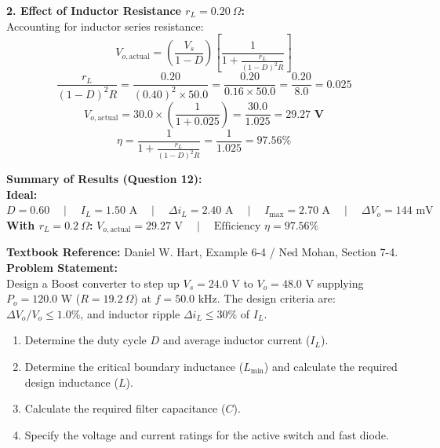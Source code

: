 \documentclass[10pt,a4paper]{article}
\begin{document}
\noindent\textbf{2. Effect of Inductor Resistance $r_L = 0.20\ \Omega$:}\\
Accounting for inductor series resistance:
\[
V_{o,\text{actual}} = \left(\frac{V_s}{1 - D}\right) \left[\frac{1}{1 + \frac{r_L}{(1 - D)^2 R}}\right]
\]
\[
\frac{r_L}{(1 - D)^2 R} = \frac{0.20}{(0.40)^2 \times 50.0} = \frac{0.20}{0.16 \times 50.0} = \frac{0.20}{8.0} = 0.025
\]
\[
V_{o,\text{actual}} = 30.0 \times \left(\frac{1}{1 + 0.025}\right) = \frac{30.0}{1.025} = \mathbf{29.27\text{ V}}
\]
\[
\eta = \frac{1}{1 + \frac{r_L}{(1 - D)^2 R}} = \frac{1}{1.025} = \mathbf{97.56\%}
\]

\begin{tcolorbox}[resbox]
\textbf{\textcolor{accentcyan}{Summary of Results (Question 12):}}\\
\textbf{Ideal:} $D = 0.60 \quad\mid\quad I_L = 1.50\text{ A} \quad\mid\quad \Delta i_L = 2.40\text{ A} \quad\mid\quad I_{\max} = 2.70\text{ A} \quad\mid\quad \Delta V_o = 144\text{ mV}$\\
\textbf{With $r_L = 0.2\ \Omega$:} $V_{o,\text{actual}} = 29.27\text{ V} \quad\mid\quad \text{Efficiency } \eta = 97.56\%$
\end{tcolorbox}

\vspace{4mm}

\begin{tcolorbox}[qbox, title={Question 13: Boost Converter Design --- Filter Sizing and Power Device Selection}]
\textbf{Textbook Reference:} Daniel W. Hart, Example 6-4 / Ned Mohan, Section 7-4.\\[1mm]
\textbf{Problem Statement:}\\
Design a Boost converter to step up $V_s = 24.0\text{ V}$ to $V_o = 48.0\text{ V}$ supplying $P_o = 120.0\text{ W}$ ($R = 19.2\ \Omega$) at $f = 50.0\text{ kHz}$.
The design criteria are: $\Delta V_o / V_o \le 1.0\%$, and inductor ripple $\Delta i_L \le 30\%$ of $I_L$.
\begin{enumerate}
  \item Determine the duty cycle $D$ and average inductor current ($I_L$).
  \item Determine the critical boundary inductance ($L_{\min}$) and calculate the required design inductance ($L$).
  \item Calculate the required filter capacitance ($C$).
  \item Specify the voltage and current ratings for the active switch and fast diode.
\end{enumerate}
\end{tcolorbox}
\end{document}
